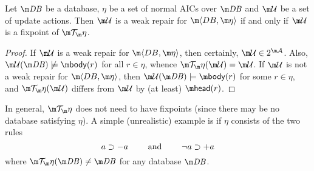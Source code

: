 % 
% 
% 
% 
% 
% 

\begin{proposition}
  \label{prop:weak-repair}
  Let $\db$ be a database, $\eta$ be a set of normal AICs over $\db$ and $\UU$ be a set of update actions.
  Then $\UU$ is a weak repair for $\fulldb$ if and only if $\UU$ is a fixpoint of $\Op$.
\end{proposition}
\begin{proof}
  If $\UU$ is a weak repair for $\fulldb$, then certainly, $\UU\in 2^{\acts}$. Also, $\UU(\db)\not\models\body(r)$ for all $r\in\eta$, whence $\Op(\UU)=\UU$.
  If $\UU$ is not a weak repair for $\fulldb$, then $\UU(\db)\models\body(r)$ for some $r\in\eta$, and $\Op(\UU)$ differs from $\UU$ by (at least) $\head(r)$.
\end{proof}

\begin{example}
  In general, $\Op$ does not need to have fixpoints (since there may be no database satisfying $\eta$).
  A simple (unrealistic) example is if $\eta$ consists of the two rules
  \[a\supset-a \qquad \mbox{ and } \qquad \neg a\supset +a\]
  where $\Op(\db)\neq\db$ for any database $\db$.
\end{example}

